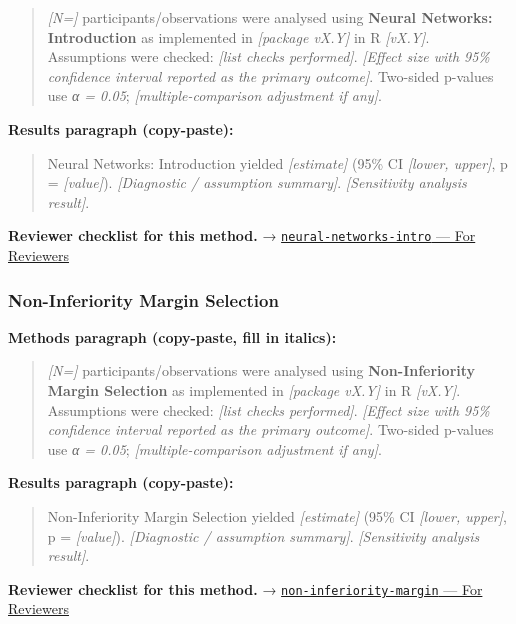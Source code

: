 \documentclass[
]{article}
\begin{document}
\begin{quote}
\emph{{[}N={]}} participants/observations were analysed using
\textbf{Neural Networks: Introduction} as implemented in
\emph{{[}package vX.Y{]}} in R \emph{{[}vX.Y{]}}. Assumptions were
checked: \emph{{[}list checks performed{]}}. \emph{{[}Effect size with
95\% confidence interval reported as the primary outcome{]}}. Two-sided
p-values use \emph{α = 0.05}; \emph{{[}multiple-comparison adjustment if
any{]}}.
\end{quote}

\textbf{Results paragraph (copy-paste):}

\begin{quote}
Neural Networks: Introduction yielded \emph{{[}estimate{]}} (95\% CI
\emph{{[}lower, upper{]}}, p = \emph{{[}value{]}}). \emph{{[}Diagnostic
/ assumption summary{]}}. \emph{{[}Sensitivity analysis result{]}}.
\end{quote}

\textbf{Reviewer checklist for this method.} →
\href{../chapters/13-ml/neural-networks-intro.Rmd\#for-reviewers}{\texttt{neural-networks-intro}
--- For Reviewers}

\subsubsection{Non-Inferiority Margin
Selection}\label{non-inferiority-margin-selection}

\textbf{Methods paragraph (copy-paste, fill in italics):}

\begin{quote}
\emph{{[}N={]}} participants/observations were analysed using
\textbf{Non-Inferiority Margin Selection} as implemented in
\emph{{[}package vX.Y{]}} in R \emph{{[}vX.Y{]}}. Assumptions were
checked: \emph{{[}list checks performed{]}}. \emph{{[}Effect size with
95\% confidence interval reported as the primary outcome{]}}. Two-sided
p-values use \emph{α = 0.05}; \emph{{[}multiple-comparison adjustment if
any{]}}.
\end{quote}

\textbf{Results paragraph (copy-paste):}

\begin{quote}
Non-Inferiority Margin Selection yielded \emph{{[}estimate{]}} (95\% CI
\emph{{[}lower, upper{]}}, p = \emph{{[}value{]}}). \emph{{[}Diagnostic
/ assumption summary{]}}. \emph{{[}Sensitivity analysis result{]}}.
\end{quote}

\textbf{Reviewer checklist for this method.} →
\href{../chapters/14-clinical/non-inferiority-margin.Rmd\#for-reviewers}{\texttt{non-inferiority-margin}
--- For Reviewers}
\end{document}

